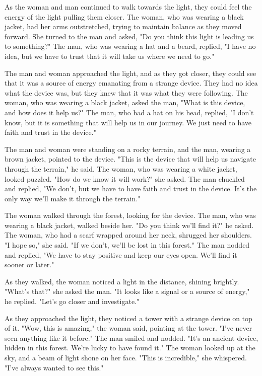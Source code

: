 \documentclass[smalldemyvopaper,11pt,twoside,onecolumn,openright,extrafontsizes]{memoir}
\begin{document}
As the woman and man continued to walk towards the light, they could feel the energy of the light pulling them closer. The woman, who was wearing a black jacket, had her arms outstretched, trying to maintain balance as they moved forward. She turned to the man and asked, "Do you think this light is leading us to something?" The man, who was wearing a hat and a beard, replied, "I have no idea, but we have to trust that it will take us where we need to go."\par
The man and woman approached the light, and as they got closer, they could see that it was a source of energy emanating from a strange device. They had no idea what the device was, but they knew that it was what they were following. The woman, who was wearing a black jacket, asked the man, "What is this device, and how does it help us?" The man, who had a hat on his head, replied, "I don't know, but it is something that will help us in our journey. We just need to have faith and trust in the device."\par
The man and woman were standing on a rocky terrain, and the man, wearing a brown jacket, pointed to the device. "This is the device that will help us navigate through the terrain," he said. The woman, who was wearing a white jacket, looked puzzled. "How do we know it will work?" she asked. The man chuckled and replied, "We don't, but we have to have faith and trust in the device. It's the only way we'll make it through the terrain."\par
The woman walked through the forest, looking for the device. The man, who was wearing a black jacket, walked beside her. "Do you think we'll find it?" he asked. The woman, who had a scarf wrapped around her neck, shrugged her shoulders. "I hope so," she said. "If we don't, we'll be lost in this forest." The man nodded and replied, "We have to stay positive and keep our eyes open. We'll find it sooner or later."\par
As they walked, the woman noticed a light in the distance, shining brightly. "What's that?" she asked the man. "It looks like a signal or a source of energy," he replied. "Let's go closer and investigate."\par
As they approached the light, they noticed a tower with a strange device on top of it. "Wow, this is amazing," the woman said, pointing at the tower. "I've never seen anything like it before." The man smiled and nodded. "It's an ancient device, hidden in this forest. We're lucky to have found it." The woman looked up at the sky, and a beam of light shone on her face. "This is incredible," she whispered. "I've always wanted to see this."\par
\end{document}
